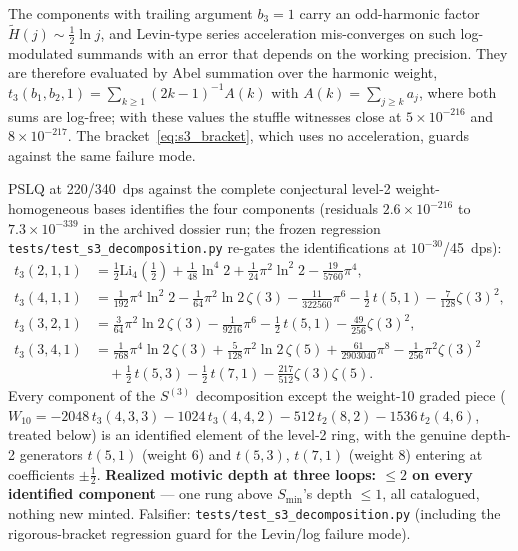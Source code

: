 \documentclass[11pt]{article}
\begin{document}
The components with trailing argument $b_3 = 1$ carry an odd-harmonic
factor $\widetilde{H}(j) \sim \tfrac12\ln j$, and Levin-type series
acceleration mis-converges on such log-modulated summands with an error
that depends on the working precision.  They are therefore evaluated by
Abel summation over the harmonic weight,
$t_3(b_1,b_2,1) = \sum_{k\ge1} (2k-1)^{-1} A(k)$ with
$A(k) = \sum_{j \ge k} a_j$, where both sums are log-free; with these
values the stuffle witnesses close at $5\times10^{-216}$ and
$8\times10^{-217}$.  The bracket~\eqref{eq:s3_bracket}, which uses no
acceleration, guards against the same failure mode.

PSLQ at 220/340~dps against the complete conjectural level-2
weight-homogeneous bases identifies the four components (residuals $2.6\times10^{-216}$ to $7.3\times10^{-339}$
in the archived dossier run; the frozen regression
\texttt{tests/test\_s3\_decomposition.py} re-gates the identifications
at $10^{-30}$/45~dps):
\begin{align}
  t_3(2,1,1) &= \tfrac{1}{2}\mathrm{Li}_4(\tfrac12)
   + \tfrac{1}{48}\ln^4 2 + \tfrac{1}{24}\pi^2\ln^2 2
   - \tfrac{19}{5760}\pi^4,
  \label{eq:t3_211}\\
  t_3(4,1,1) &= \tfrac{1}{192}\pi^4\ln^2 2
   - \tfrac{1}{64}\pi^2\ln 2\,\zeta(3)
   - \tfrac{11}{322560}\pi^6 - \tfrac{1}{2}\,t(5,1)
   - \tfrac{7}{128}\zeta(3)^2,
  \label{eq:t3_411}\\
  t_3(3,2,1) &= \tfrac{3}{64}\pi^2\ln 2\,\zeta(3)
   - \tfrac{1}{9216}\pi^6
   - \tfrac{1}{2}\,t(5,1) - \tfrac{49}{256}\zeta(3)^2,
  \label{eq:t3_321}\\
  t_3(3,4,1) &= \tfrac{1}{768}\pi^4\ln 2\,\zeta(3)
   + \tfrac{5}{128}\pi^2\ln 2\,\zeta(5)
   + \tfrac{61}{2903040}\pi^8 - \tfrac{1}{256}\pi^2\zeta(3)^2
   \nonumber\\
   &\quad + \tfrac{1}{2}\,t(5,3) - \tfrac{1}{2}\,t(7,1)
   - \tfrac{217}{512}\zeta(3)\zeta(5).
  \label{eq:t3_341}
\end{align}
Every component of the $S^{(3)}$ decomposition except the weight-10
graded piece ($W_{10} = -2048\,t_3(4,3,3) - 1024\,t_3(4,4,2)
- 512\,t_2(8,2) - 1536\,t_2(4,6)$, treated below)
is an identified element of the level-2 ring, with the genuine
depth-2 generators $t(5,1)$ (weight 6) and $t(5,3)$, $t(7,1)$
(weight 8) entering at coefficients $\pm\tfrac12$.
\textbf{Realized motivic depth at three loops: $\le 2$ on every
identified component} --- one rung above $S_{\min}$'s depth $\le 1$,
all catalogued, nothing new minted.  Falsifier:
\texttt{tests/test\_s3\_decomposition.py} (including the
rigorous-bracket regression guard for the Levin/log failure mode).
\end{document}
